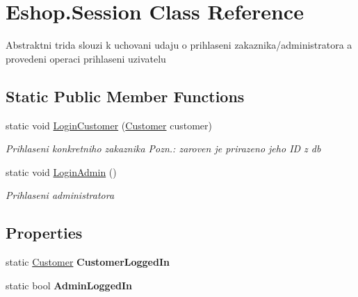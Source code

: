 \hypertarget{class_eshop_1_1_session}{}\section{Eshop.\+Session Class Reference}
\label{class_eshop_1_1_session}


Abstraktni trida slouzi k uchovani udaju o prihlaseni zakaznika/administratora a provedeni operaci prihlaseni uzivatelu  


\subsection*{Static Public Member Functions}
\begin{DoxyCompactItemize}
\item 
static void \mbox{\hyperlink{class_eshop_1_1_session_a2843d0754878d156e50ebd96e93ca1c3}{Login\+Customer}} (\mbox{\hyperlink{class_eshop_1_1_customer}{Customer}} customer)
\begin{DoxyCompactList}\small\item\em Prihlaseni konkretniho zakaznika Pozn.\+: zaroven je prirazeno jeho ID z db \end{DoxyCompactList}\item 
static void \mbox{\hyperlink{class_eshop_1_1_session_a9808d695ce5e2fbfbaf730b37334ac8b}{Login\+Admin}} ()
\begin{DoxyCompactList}\small\item\em Prihlaseni administratora \end{DoxyCompactList}\end{DoxyCompactItemize}
\subsection*{Properties}
\begin{DoxyCompactItemize}
\item 
\mbox{\label{class_eshop_1_1_session_a1d6e3129f0a09d834c696e0f30719dce}} 
static \mbox{\hyperlink{class_eshop_1_1_customer}{Customer}} {\bfseries Customer\+Logged\+In}
\item 
\mbox{\label{class_eshop_1_1_session_abeea2f9428d2aded1343f78412af0dd6}} 
static bool {\bfseries Admin\+Logged\+In}
\end{DoxyCompactItemize}


